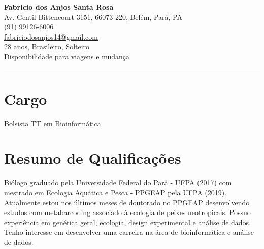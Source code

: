 \documentclass[a4paper,10pt]{article}
\begin{document}
	
	\begin{center}
		\textbf{\huge Fabricio dos Anjos Santa Rosa}\\
		\vspace{2mm}
		Av. Gentil Bittencourt 3151, 66073-220, Belém, Pará, PA\\
		(91) 99126-6006\\
		\href{mailto:fabriciodosanjos14@gmail.com}{fabriciodosanjos14@gmail.com}\\
		28 anos, Brasileiro, Solteiro\\
		Disponibilidade para viagens e mudança
	\end{center}

	\noindent\rule{\linewidth}{0.8pt}
	
	\section*{Cargo}
	Bolsista TT em Bioinformática

	
	\section*{Resumo de Qualificações}
	Biólogo graduado pela Universidade Federal do Pará - UFPA (2017) com mestrado em Ecologia Aquática e Pesca - PPGEAP pela UFPA (2019). Atualmente estou nos últimos meses de doutorado no PPGEAP desenvolvendo estudos com metabarcoding associado à ecologia de peixes neotropicais. Possuo experiência em genética geral, ecologia, design experimental e análise de dados. Tenho interesse em desenvolver uma carreira na área de bioinformática e análise de dados.
	
\end{document}
